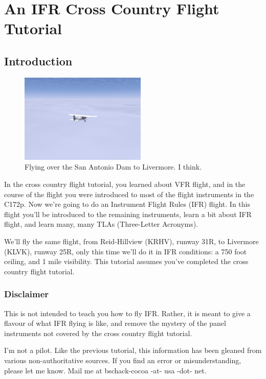 \chapter{An IFR Cross Country Flight Tutorial\label{ifr}}

\section{Introduction}

\begin{figure}[h]
  \begin{center}
    \includegraphics[width=6cm]{img/somewhere.png}
    \caption{Flying over the San Antonio Dam to Livermore.  I think.}
    \label{fig:somewhere}
  \end{center}
\end{figure}

In the cross country flight tutorial, you learned about VFR flight,
and in the course of the flight you were introduced to most of the
flight instruments in the C172p.  Now we're going to do an Instrument
Flight Rules (IFR) flight.  In this flight you'll be introduced to the
remaining instruments, learn a bit about IFR flight, and learn many,
many TLAs (Three-Letter Acronyms).

We'll fly the same flight, from Reid-Hillview (KRHV), runway 31R, to
Livermore (KLVK), runway 25R, only this time we'll do it in IFR
conditions: a 750 foot ceiling, and 1 mile visibility.  This tutorial
assumes you've completed the cross country flight tutorial.

\subsection{Disclaimer}

This is not intended to teach you how to fly IFR.  Rather, it is meant
to give a flavour of what IFR flying is like, and remove the mystery
of the panel instruments not covered by the cross country flight
tutorial.

I'm not a pilot.  Like the previous tutorial, this information has
been gleaned from various non-authoritative sources.  If you find an
error or misunderstanding, please let me know.  Mail me at
bschack-cocoa -at- usa -dot- net.

